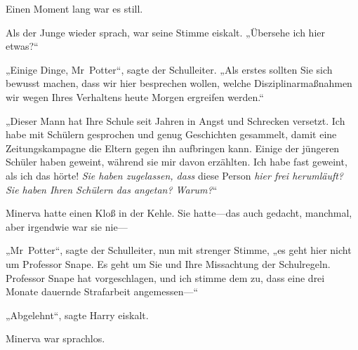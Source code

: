 Einen Moment lang war es still.

Als der Junge wieder sprach, war seine Stimme eiskalt. „Übersehe ich hier etwas?“

„Einige Dinge, Mr~Potter“, sagte der Schulleiter. „Als erstes sollten Sie sich bewusst machen, dass wir hier besprechen wollen, welche Disziplinarmaßnahmen wir wegen Ihres Verhaltens heute Morgen ergreifen werden.“

„Dieser Mann hat Ihre Schule seit Jahren in Angst und Schrecken versetzt. Ich habe mit Schülern gesprochen und genug Geschichten gesammelt, damit eine Zeitungskampagne die Eltern gegen ihn aufbringen kann. Einige der jüngeren Schüler haben geweint, während sie mir davon erzählten. Ich habe fast geweint, als ich das hörte! \emph{Sie haben zugelassen, dass} diese Person \emph{hier frei herumläuft? Sie haben Ihren Schülern das angetan? Warum?}“

Minerva hatte einen Kloß in der Kehle. Sie hatte—das auch gedacht, manchmal, aber irgendwie war sie nie—

„Mr~Potter“, sagte der Schulleiter, nun mit strenger Stimme, „es geht hier nicht um Professor Snape. Es geht um Sie und Ihre Missachtung der Schulregeln. Professor Snape hat vorgeschlagen, und ich stimme dem zu, dass eine drei Monate dauernde Strafarbeit angemessen—“

„Abgelehnt“, sagte Harry eiskalt.

Minerva war sprachlos.

